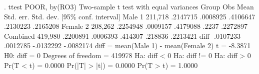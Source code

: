 . ttest POOR, by(RO3)
{\smallskip}
Two-sample t test with equal variances
   Group {\VBAR}     Obs        Mean    Std. err.   Std. dev.   [95\% conf. interval]
  Male 1 {\VBAR} 211,718    .2147715    .0008925    .4106647    .2130223    .2165208
Female 2 {\VBAR} 208,262    .2254948    .0009157    .4179088       .2237    .2272897
Combined {\VBAR} 419,980    .2200891    .0006393     .414307     .218836    .2213421
    diff {\VBAR}           -.0107233    .0012785               -.0132292   -.0082174
    diff = mean(Male 1) - mean(Female 2)                          t =  -8.3871
H0: diff = 0                                     Degrees of freedom =   419978
{\smallskip}
    Ha: diff < 0                 Ha: diff != 0                 Ha: diff > 0
 Pr(T < t) = 0.0000         Pr(|T| > |t|) = 0.0000          Pr(T > t) = 1.0000
{\smallskip}

